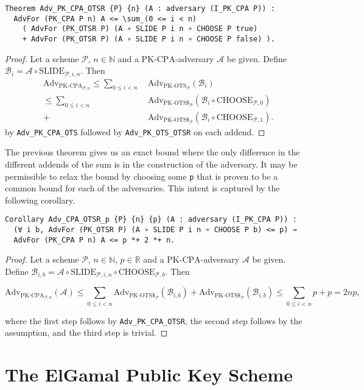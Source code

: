 \documentclass[a4paper,USenglish,cleveref, autoref]{lipics-v2021}
\newcommand{\M}[1]{\texttt{#1}}
\newcommand{\Adv}{\mathrm{Adv}}
\newcommand{\A}{\mathcal{A}}
\renewcommand{\P}{\mathcal{P}}
\newcommand{\CPA}{\ensuremath{\mathrm{PK\text{-}CPA}}}
\newcommand{\OTS}{\ensuremath{\mathrm{PK\text{-}OTS}}}
\newcommand{\OTSR}{\ensuremath{\mathrm{PK\text{-}OTS\$}}}
\newcommand{\SLIDE}{\ensuremath{\mathrm{SLIDE}}}
\newcommand{\CHOOSE}{\ensuremath{\mathrm{CHOOSE}}}
\begin{document}
\begin{verbatim}
Theorem Adv_PK_CPA_OTSR {P} {n} (A : adversary (I_PK_CPA P)) :
  AdvFor (PK_CPA P n) A <= \sum_(0 <= i < n)
    ( AdvFor (PK_OTSR P) (A ∘ SLIDE P i n ∘ CHOOSE P true)
    + AdvFor (PK_OTSR P) (A ∘ SLIDE P i n ∘ CHOOSE P false) ).
\end{verbatim}
\begin{proof}
  Let a scheme $\P$, $n \in \mathbb{N}$ and a \CPA-adversary $\A$ be given.
  Define $\mathcal{B}_i = \mathcal{A} \circ \SLIDE_{\P,i,n}$. Then
  \begin{align*}
    \Adv_{\CPA_{\P,n}}
    \leq \sum_{0 \leq i < n}\ &\Adv_{\OTS_{\P}}(\mathcal{B}_i) \\
    \leq \sum_{0 \leq i < n}\ &\Adv_{\OTSR_{\P}}(\mathcal{B}_i \circ \CHOOSE_{\P,0}) \\
    +\ &\Adv_{\OTSR_{\P}}(\mathcal{B}_i \circ \CHOOSE_{\P,1}).
  \end{align*}
  by \M{Adv_PK_CPA_OTS} followed by \M{Adv_PK_OTS_OTSR} on each addend.
\end{proof}

The previous theorem gives us an exact bound where the only difference
in the different addends of the sum is in the construction of the adversary.
It may be permissible to relax the bound by choosing some \M{p}
that is proven to be a common bound for each of the adversaries.
This intent is captured by the following corollary.

\begin{verbatim}
Corollary Adv_CPA_OTSR_p {P} {n} {p} (A : adversary (I_PK_CPA P)) :
  (∀ i b, AdvFor (PK_OTSR P) (A ∘ SLIDE P i n ∘ CHOOSE P b) <= p) →
  AdvFor (PK_CPA P n) A <= p *+ 2 *+ n.
\end{verbatim}
\begin{proof}
  Let a scheme $\P$, $n \in \mathbb{N}$, $p \in \mathbb{R}$
  and a \CPA-adversary $\A$ be given.
  Define $\mathcal{B}_{i,b} = \A \circ \SLIDE_{\P,i,n} \circ \CHOOSE_{\P,b}$.
  Then

  $$\Adv_{\CPA_{\P,n}}(\A) \leq
    \sum_{0 \leq i < n} \Adv_{\OTSR_\P}(\mathcal{B}_{i,b}) + \Adv_{\OTSR_\P}(\mathcal{B}_{i,b}) \leq
    \sum_{0 \leq i < n} p + p = 2np,$$

  where the first step follows by \M{Adv_PK_CPA_OTSR}, the second step
  follows by the assumption, and the third step is trivial.
\end{proof}

\section{The ElGamal Public Key Scheme}\label{sec:elgamal}
\end{document}
